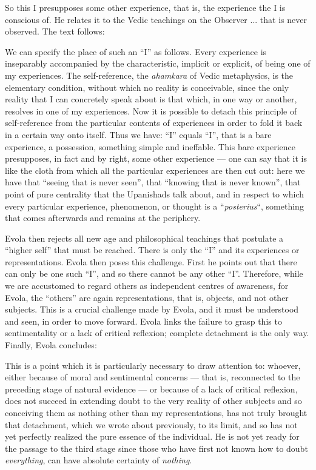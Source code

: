 So this I presupposes some other experience, that is, the experience the I is conscious of. He relates it to the Vedic teachings on the Observer
... that is never observed. The text follows:


\begin{quotex}
We can specify the place of such an ``I'' as follows. Every experience is inseparably accompanied by the characteristic, implicit or explicit, of being one of my experiences. The self-reference, the \emph{ahamkara} of Vedic metaphysics, is the elementary condition, without which no reality is conceivable, since the only reality that I can concretely speak about is that which, in one way or another, resolves in one of my experiences. Now it is possible to detach this principle of self-reference from the particular contents of experiences in order to fold it back in a certain way onto itself. Thus we have: ``I'' equals ``I'', that is a bare experience, a possession, something simple and ineffable. This bare experience presupposes, in fact and by right, some other experience --- one can say that it is like the cloth from which all the particular experiences are then cut out: here we have that ``seeing that is never seen'', that ``knowing that is never known'', that point of pure centrality that the Upanishads talk about, and in respect to which every particular experience, phenomenon, or thought is a ``\emph{posterius}``, something that comes afterwards and remains at the periphery.
\end{quotex}


Evola then rejects all new age and philosophical teachings that postulate a ``higher self'' that must be reached. There is only the ``I'' and its experiences or representations. Evola then poses this challenge. First he points out that there can only be one such ``I'', and so there cannot be any other ``I''. Therefore, while we are accustomed to regard others as independent centres of awareness, for Evola, the ``others'' are again representations, that is, objects, and not other subjects. This is a crucial challenge made by Evola, and it must be understood and seen, in order to move forward. Evola links the failure to grasp this to sentimentality or a lack of critical reflexion; complete detachment is the only way. Finally, Evola concludes:

\begin{quotex}
This is a point which it is particularly necessary to draw attention to: whoever, either because of moral and sentimental concerns --- that is, reconnected to the preceding stage of natural evidence --- or because of a lack of critical reflexion, does not succeed in extending doubt to the very reality of other subjects and so conceiving them as nothing other than my representations, has not truly brought that detachment, which we wrote about previously, to its limit, and so has not yet perfectly realized the pure essence of the individual. He is not yet ready for the passage to the third stage since those who have first not known how to doubt \emph{everything}, can have absolute certainty of \emph{nothing}.
\end{quotex}


